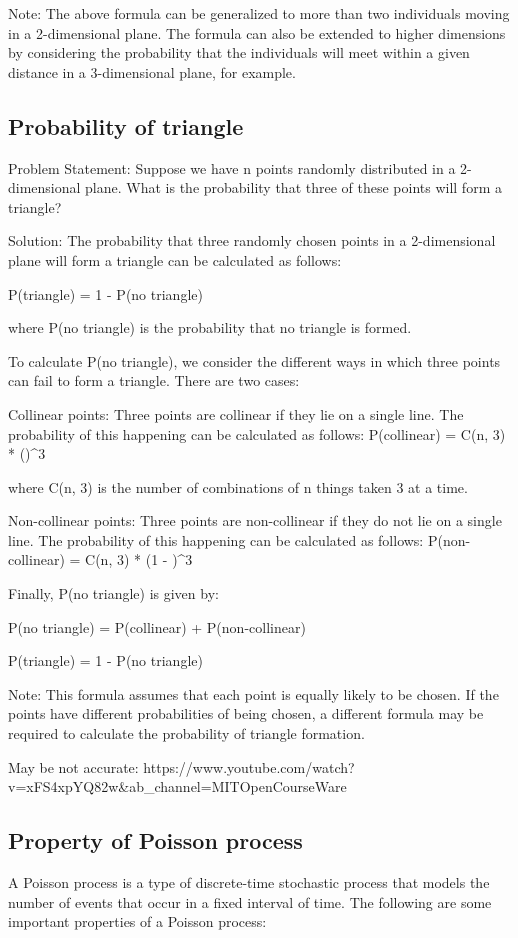 \documentclass[12pt, a4paper, oneside]{article}
\begin{document}
Note: The above formula can be generalized to more than two individuals moving in a 2-dimensional plane. The formula can also be extended to higher dimensions by considering the probability that the individuals will meet within a given distance in a 3-dimensional plane, for example.
\subsection{ Probability of triangle }
Problem Statement:
Suppose we have n points randomly distributed in a 2-dimensional plane. What is the probability that three of these points will form a triangle?

Solution:
The probability that three randomly chosen points in a 2-dimensional plane will form a triangle can be calculated as follows:

P(triangle) = 1 - P(no triangle)

where P(no triangle) is the probability that no triangle is formed.

To calculate P(no triangle), we consider the different ways in which three points can fail to form a triangle. There are two cases:

Collinear points: Three points are collinear if they lie on a single line. The probability of this happening can be calculated as follows:
P(collinear) = C(n, 3) * ()^3

where C(n, 3) is the number of combinations of n things taken 3 at a time.

Non-collinear points: Three points are non-collinear if they do not lie on a single line. The probability of this happening can be calculated as follows:
P(non-collinear) = C(n, 3) * (1 - )^3

Finally, P(no triangle) is given by:

P(no triangle) = P(collinear) + P(non-collinear)

P(triangle) = 1 - P(no triangle)

Note: This formula assumes that each point is equally likely to be chosen. If the points have different probabilities of being chosen, a different formula may be required to calculate the probability of triangle formation.

May be not accurate: https://www.youtube.com/watch?v=xFS4xpYQ82w&ab_channel=MITOpenCourseWare
\subsection{ Property of Poisson process }
A Poisson process is a type of discrete-time stochastic process that models the number of events that occur in a fixed interval of time. The following are some important properties of a Poisson process:
\end{document}
